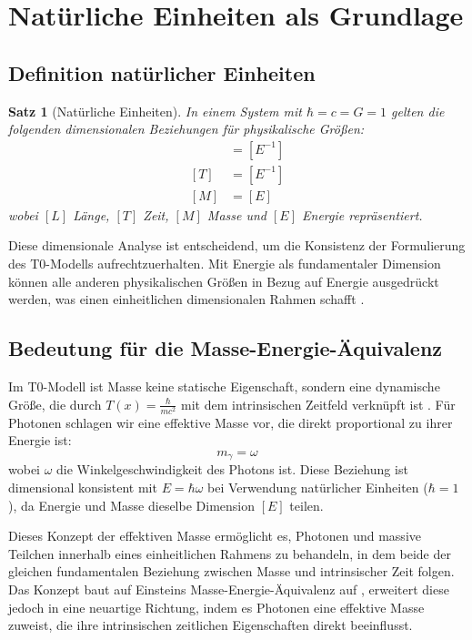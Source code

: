 \documentclass[12pt,a4paper]{article}
\newcommand{\Tfield}{T(x)}
\newtheorem{theorem}{Satz}[section]
\begin{document}
	\section{Natürliche Einheiten als Grundlage}
	\subsection{Definition natürlicher Einheiten}
	\begin{theorem}[Natürliche Einheiten]
		In einem System mit \(\hbar = c = G = 1\) gelten die folgenden dimensionalen Beziehungen für physikalische Größen:
		\begin{align}
			[L] &= [E^{-1}] \\
			[T] &= [E^{-1}] \\
			[M] &= [E]
		\end{align}
		wobei \([L]\) Länge, \([T]\) Zeit, \([M]\) Masse und \([E]\) Energie repräsentiert.
	\end{theorem}
	
	Diese dimensionale Analyse ist entscheidend, um die Konsistenz der Formulierung des T0-Modells aufrechtzuerhalten. Mit Energie als fundamentaler Dimension können alle anderen physikalischen Größen in Bezug auf Energie ausgedrückt werden, was einen einheitlichen dimensionalen Rahmen schafft \cite{pascher_alpha_2025}.
	
	\subsection{Bedeutung für die Masse-Energie-Äquivalenz}
	Im T0-Modell ist Masse keine statische Eigenschaft, sondern eine dynamische Größe, die durch \(\Tfield = \frac{\hbar}{m c^2}\) mit dem intrinsischen Zeitfeld verknüpft ist \cite{pascher_lagrange_2025}. Für Photonen schlagen wir eine effektive Masse vor, die direkt proportional zu ihrer Energie ist:
	\begin{equation}
		m_\gamma = \omega
	\end{equation}
	wobei \(\omega\) die Winkelgeschwindigkeit des Photons ist. Diese Beziehung ist dimensional konsistent mit \(E = \hbar \omega\) bei Verwendung natürlicher Einheiten (\(\hbar = 1\)), da Energie und Masse dieselbe Dimension \([E]\) teilen.
	
	Dieses Konzept der effektiven Masse ermöglicht es, Photonen und massive Teilchen innerhalb eines einheitlichen Rahmens zu behandeln, in dem beide der gleichen fundamentalen Beziehung zwischen Masse und intrinsischer Zeit folgen. Das Konzept baut auf Einsteins Masse-Energie-Äquivalenz auf \cite{einstein}, erweitert diese jedoch in eine neuartige Richtung, indem es Photonen eine effektive Masse zuweist, die ihre intrinsischen zeitlichen Eigenschaften direkt beeinflusst.
	
\end{document}
